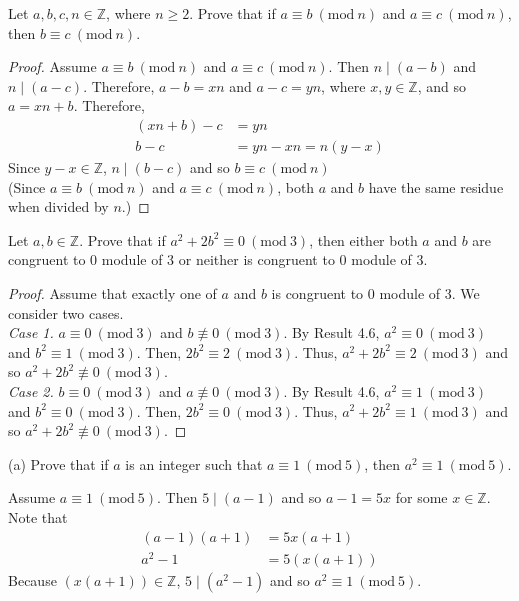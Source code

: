 \documentclass[12pt]{article}
\newcommand{\Z}{\mathbb{Z}}
\newcommand{\Mod}[1]{\ (\mathrm{mod}\ #1)}
\newenvironment{problem}[2][Problem]{\begin{trivlist}
		\item[\hskip \labelsep {\bfseries #1}\hskip \labelsep {\bfseries #2.}]}{\end{trivlist}}
\newenvironment{solution}[2][Solution]{\begin{trivlist}
		\item[\hskip \labelsep {\bfseries #1}\hskip \labelsep {\bfseries #2.}]}{\end{trivlist}}
\begin{document}
	\begin{problem}{15}
		Let $a,b,c,n \in \Z$, where $n\geq 2$. Prove that if $a \equiv b \Mod n$ and $a \equiv c \Mod n$, then $b\equiv c \Mod n$.
		\begin{proof}
			Assume $a \equiv b \Mod n$ and $a \equiv c \Mod n$. Then $n\mid(a-b)$ and $n\mid (a-c)$. Therefore, $a-b=xn$ and $a-c = yn$, where $x,y\in \Z$, and so $a=xn+b$. Therefore, 
			\begin{align*}
				(xn+b)-c &= yn\\
				b-c &= yn-xn = n(y-x)
			\end{align*}
			Since $y-x\in \Z$, $n\mid (b-c)$ and so $b \equiv c \Mod n$\\
			
			(Since $a \equiv b \Mod n$ and $a \equiv c \Mod n$, both $a$ and $b$ have the same residue when divided by $n$.)
		\end{proof}
	\end{problem}

	\begin{problem}{16}
		Let $a,b \in \Z$. Prove that if $a^{2}+2b^{2} \equiv 0 \Mod 3$, then either both $a$ and $b$ are congruent to 0 module of 3 or neither is congruent to 0 module of 3.\\ 
		\begin{proof}
			Assume that exactly one of $a$ and $b$ is congruent to 0 module of 3. We consider two cases.\\
			\textit{Case 1.} $a \equiv 0 \Mod 3$ and $b \not\equiv 0 \Mod 3$. By Result 4.6, $a^{2} \equiv 0 \Mod 3$ and $b^{2} \equiv 1 \Mod 3$. Then,  $2b^{2}\equiv 2 \Mod 3$. Thus, $a^{2} + 2b^{2} \equiv 2 \Mod 3$ and so $a^{2} + 2b^{2} \not\equiv 0 \Mod 3$.\\
			
			\textit{Case 2.} $b \equiv 0 \Mod 3$ and $a \not\equiv 0 \Mod 3$. By Result 4.6, $a^{2} \equiv 1 \Mod 3$ and $b^{2} \equiv 0 \Mod 3$. Then, $2b^{2} \equiv 0 \Mod 3$. Thus, $a^{2} + 2b^{2} \equiv 1 \Mod 3$ and so $a^{2} + 2b^{2} \not\equiv 0 \Mod 3$. 
		\end{proof}
	\end{problem}

	\begin{problem}{17}
		(a) Prove that if $a$ is an integer such that $a \equiv 1 \Mod 5$, then $a^{2}\equiv 1 \Mod 5$.
		\begin{solution}{a}
			Assume $a\equiv 1\Mod 5$. Then $5\mid (a-1)$ and so $a-1 = 5x$ for some $x\in \Z$. Note that
			\begin{align*}
				(a-1)(a+1) &= 5x(a+1)\\
				a^{2}-1 &= 5(x(a+1))
			\end{align*}
			Because $(x(a+1))\in \Z$, $5\mid (a^{2}-1)$ and so $a^{2} \equiv 1 \Mod 5$.
		\end{solution}
	\end{problem}
\end{document}
